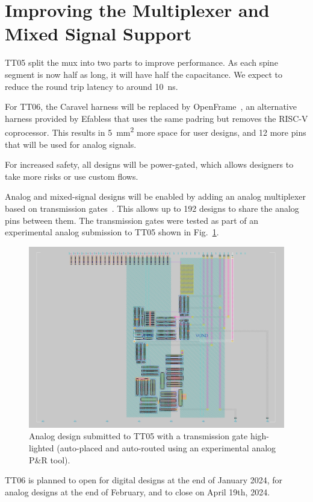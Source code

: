 \section{Improving the Multiplexer and Mixed Signal Support}
\label{sec:improving}

TT05 split the mux into two parts to improve performance.
As each spine segment is now half as long, it will have half the capacitance.
We expect to reduce the round trip latency to around \qty{10}{\ns}.

For TT06, the Caravel harness will be replaced by OpenFrame~\cite{openframe}, an alternative harness provided by Efabless that uses the same padring but removes the RISC-V coprocessor.
This results in \qty{5}{\mm\squared} more space for user designs, and 12 more pins that will be used for analog signals.

For increased safety, all designs will be power-gated, which allows designers to take more risks or use custom flows.

Analog and mixed-signal designs will be enabled by adding an analog multiplexer based on transmission gates~\cite{transmissiongates}. 
This allows up to 192 designs to share the analog pins between them.
The transmission gates were tested as part of an experimental analog submission to TT05 shown in Fig.~\ref{fig:transmission_gate_TT05}.

\begin{figure}[!t]
\centering
\includegraphics[width=\columnwidth]{./Figs/tt05_transmission_gate.png}
\caption{Analog design submitted to TT05 with a transmission gate high-lighted (auto-placed and auto-routed using an experimental analog P\&R tool).}
\label{fig:transmission_gate_TT05}
\end{figure}

TT06 is planned to open for digital designs at the end of January 2024, for analog designs at the end of February, and to close on April 19th, 2024.
